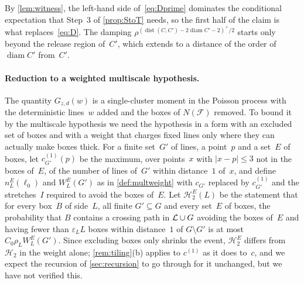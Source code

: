 \documentclass[11pt,letterpaper]{article}
\DeclareMathOperator{\diam}{diam}
\DeclareMathOperator{\dist}{dist}
\begin{document}
By \cref{lem:witness}, the left-hand side of~\eqref{eq:Dprime} dominates the conditional expectation that Step~3 of \cref{prop:StoT} needs, so the first half of the claim is what replaces~\eqref{eq:D}. The damping $\rho^{(\dist(C,C')-2\diam C'-2)^+/2}$ starts only beyond the release region of~$C'$, which extends to a distance of the order of $\diam C'$ from~$C'$.

\paragraph{Reduction to a weighted multiscale hypothesis.} The quantity $G_{z,d}(w)$ is a single-cluster moment in the Poisson process with the deterministic lines~$w$ added and the boxes of $N(\mathcal F)$ removed. To bound it by the multiscale hypothesis we need the hypothesis in a form with an excluded set of boxes and with a weight that charges fixed lines only where they can actually make boxes thick. For a finite set~$G'$ of lines, a point~$p$ and a set~$E$ of boxes, let $c^{(1)}_{G'}(p)$ be the maximum, over points~$x$ with $\lvert x-p\rvert\le3$ not in the boxes of~$E$, of the number of lines of~$G'$ within distance~$1$ of~$x$, and define $n^{E}_L(\ell_0)$ and $W^{E}_L(G')$ as in \cref{def:multweight} with $c_{G'}$ replaced by $c^{(1)}_{G'}$ and the stretches~$I$ required to avoid the boxes of~$E$. Let $\mathcal H^{E}_2(L)$ be the statement that for every box~$B$ of side~$L$, all finite $G'\subseteq G$ and every set~$E$ of boxes, the probability that $B$ contains a crossing path in $\mathcal L\cup G$ avoiding the boxes of~$E$ and having fewer than $\varepsilon_LL$ boxes within distance~$1$ of $G\setminus G'$ is at most $C_0\rho_LW^{E}_L(G')$. Since excluding boxes only shrinks the event, $\mathcal H_2^E$ differs from $\mathcal H_2$ in the weight alone; \cref{rem:tiling}(b) applies to $c^{(1)}$ as it does to~$c$, and we expect the recursion of \cref{sec:recursion} to go through for it unchanged, but we have not verified this.
\end{document}
